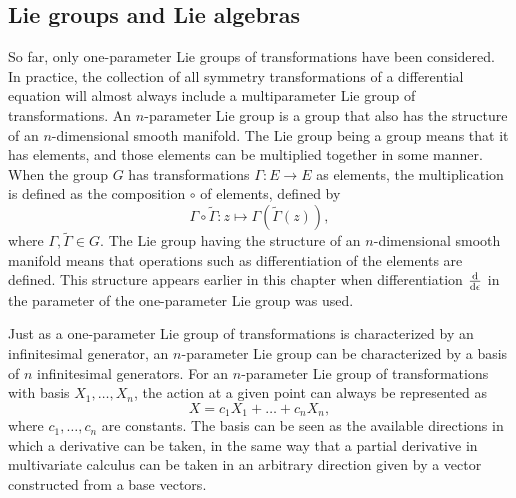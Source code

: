 \subsection{Lie groups and Lie algebras}

So far, only one-parameter Lie groups of transformations have been considered.
In practice, the collection of all symmetry transformations of a differential equation will almost always include a multiparameter Lie group of transformations.
An \(n\)-parameter Lie group is a group that also has the structure of an \(n\)-dimensional smooth manifold.
The Lie group being a group means that it has elements, and those elements can be multiplied together in some manner.
When the group \(G\) has transformations \(\Gamma: E \to E\) as elements, the multiplication is defined as the composition \(\circ\) of elements, defined by
\begin{equation}
  \Gamma \circ \tilde{\Gamma}: z \mapsto \Gamma\left(\tilde{\Gamma}(z)\right),
\end{equation}
where \(\Gamma, \tilde{\Gamma} \in G\).
The Lie group having the structure of an \(n\)-dimensional smooth manifold means that operations such as differentiation of the elements are defined.
This structure appears earlier in this chapter when differentiation \(\diff*{}{\epsilon}\) in the parameter of the one-parameter Lie group was used.

Just as a one-parameter Lie group of transformations is characterized by an infinitesimal generator, an \(n\)-parameter Lie group can be characterized by a basis of \(n\) infinitesimal generators.
For an \(n\)-parameter Lie group of transformations with basis \(X_1, \dots, X_n\), the action at a given point can always be represented as
\begin{equation}
  X = c_1 X_1 + \dots + c_n X_n,
\end{equation}
where \(c_1, \dots, c_n\) are constants.
The basis can be seen as the available directions in which a derivative can be taken, in the same way that a partial derivative in multivariate calculus can be taken in an arbitrary direction given by a vector constructed from a base vectors.

